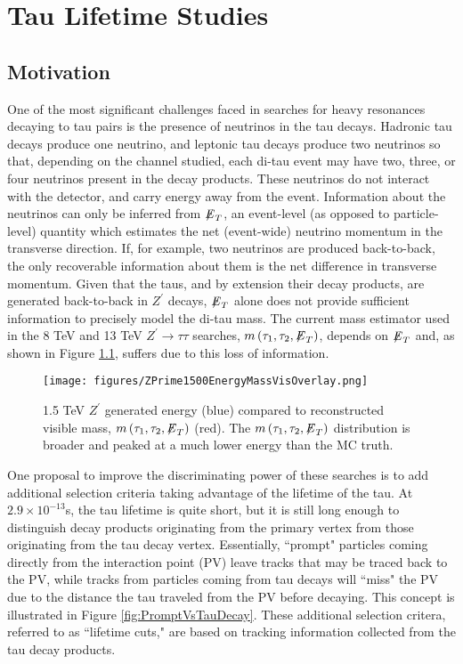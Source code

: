 \chapter{Tau Lifetime Studies}

\section{Motivation}

One of the most significant challenges faced in searches for heavy resonances decaying to tau pairs is the presence of neutrinos in the tau decays. Hadronic tau decays produce one neutrino, and leptonic tau decays produce two neutrinos so that, depending on the channel studied, each di-tau event may have two, three, or four neutrinos present in the decay products. These neutrinos do not interact with the detector, and carry energy away from the event. Information about the neutrinos can only be inferred from ${\not\mathrel{E}}_T$, an event-level (as opposed to particle-level) quantity which estimates the net (event-wide) neutrino momentum in the transverse direction. If, for example, two neutrinos are produced back-to-back, the only recoverable information about them is the net difference in transverse momentum. Given that the taus, and by extension their decay products, are generated back-to-back in $Z^\prime$ decays, ${\not\mathrel{E}}_T$ alone does not provide sufficient information to precisely model the di-tau mass. The current mass estimator used in the 8 TeV and 13 TeV $Z^\prime\to\tau\tau$ searches, $m\left(\tau_1, \tau_2, {\not\mathrel{E}}_T\right)$, depends on ${\not\mathrel{E}}_T$ and, as shown in Figure \ref{fig:massVisSigVsMC}, suffers due to this loss of information.

\begin{figure}[tbh!]
\centering
\texttt{[image: figures/ZPrime1500EnergyMassVisOverlay.png]}
\caption{1.5 TeV $Z^\prime$ generated energy (blue) compared to reconstructed visible mass, $m\left(\tau_1, \tau_2, {\not\mathrel{E}}_T\right)$ (red). The $m\left(\tau_1, \tau_2, {\not\mathrel{E}}_T\right)$ distribution is broader and peaked at a much lower energy than the MC truth.}
\label{fig:massVisSigVsMC}
\end{figure}

One proposal to improve the discriminating power of these searches is to add additional selection criteria taking advantage of the lifetime of the tau. At $2.9\times 10^{-13}$s, the tau lifetime is quite short, but it is still long enough to distinguish decay products originating from the primary vertex from those originating from the tau decay vertex. Essentially, ``prompt" particles coming directly from the interaction point (PV) leave tracks that may be traced back to the PV, while tracks from particles coming from tau decays will ``miss" the PV due to the distance the tau traveled from the PV before decaying. This concept is illustrated in Figure \ref{fig:PromptVsTauDecay}. These additional selection critera, referred to as ``lifetime cuts," are based on tracking information collected from the tau decay products.

